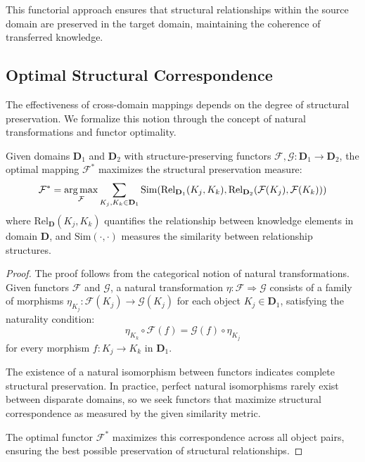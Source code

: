 This functorial approach ensures that structural relationships within the source domain are preserved in the target domain, maintaining the coherence of transferred knowledge.

\subsection{Optimal Structural Correspondence}

The effectiveness of cross-domain mappings depends on the degree of structural preservation. We formalize this notion through the concept of natural transformations and functor optimality.

\begin{theorem}
Given domains $\mathbf{D}_1$ and $\mathbf{D}_2$ with structure-preserving functors $\mathcal{F}, \mathcal{G}: \mathbf{D}_1 \rightarrow \mathbf{D}_2$, the optimal mapping $\mathcal{F}^*$ maximizes the structural preservation measure:
\begin{equation}
\mathcal{F}^* = \mathop{\mathrm{arg\,max}}_{\mathcal{F}} \sum_{K_j, K_k \in \mathbf{D}_1} \text{Sim}(\text{Rel}_{\mathbf{D}_1}(K_j, K_k), \text{Rel}_{\mathbf{D}_2}(\mathcal{F}(K_j), \mathcal{F}(K_k)))
\end{equation}
where $\text{Rel}_{\mathbf{D}}(K_j, K_k)$ quantifies the relationship between knowledge elements in domain $\mathbf{D}$, and $\text{Sim}(\cdot,\cdot)$ measures the similarity between relationship structures.
\end{theorem}

\begin{proof}
The proof follows from the categorical notion of natural transformations. Given functors $\mathcal{F}$ and $\mathcal{G}$, a natural transformation $\eta: \mathcal{F} \Rightarrow \mathcal{G}$ consists of a family of morphisms $\eta_{K_j}: \mathcal{F}(K_j) \rightarrow \mathcal{G}(K_j)$ for each object $K_j \in \mathbf{D}_1$, satisfying the naturality condition:
\begin{equation}
\eta_{K_k} \circ \mathcal{F}(f) = \mathcal{G}(f) \circ \eta_{K_j}
\end{equation}
for every morphism $f: K_j \rightarrow K_k$ in $\mathbf{D}_1$.

The existence of a natural isomorphism between functors indicates complete structural preservation. In practice, perfect natural isomorphisms rarely exist between disparate domains, so we seek functors that maximize structural correspondence as measured by the given similarity metric.

The optimal functor $\mathcal{F}^*$ maximizes this correspondence across all object pairs, ensuring the best possible preservation of structural relationships.
\end{proof}

